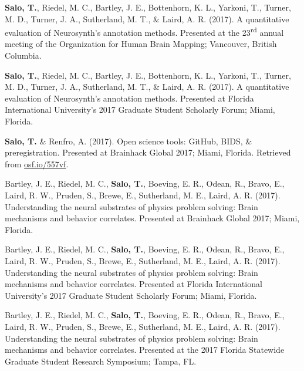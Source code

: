 \documentclass[10pt]{article}
\newcommand{\sectionstyle}{\LARGE \fontfamily{pcr}\selectfont}
\begin{document}
\begin{hangparas}{.25in}{1}
\textbf{Salo, T.}, Riedel, M. C., Bartley, J. E., Bottenhorn, K. L., Yarkoni, T., Turner, M. D., Turner, J. A., Sutherland, M. T., \& Laird, A. R. (2017). A quantitative evaluation of Neurosynth's annotation methods. Presented at the 23\textsuperscript{rd} annual meeting of the Organization for Human Brain Mapping; Vancouver, British Columbia.

\bigskip

\textbf{Salo, T.}, Riedel, M. C., Bartley, J. E., Bottenhorn, K. L., Yarkoni, T., Turner, M. D., Turner, J. A., Sutherland, M. T., \& Laird, A. R. (2017). A quantitative evaluation of Neurosynth's annotation methods. Presented at Florida International University's 2017 Graduate Student Scholarly Forum; Miami, Florida.

\bigskip

\textbf{Salo, T.} \& Renfro, A. (2017). Open science tools: GitHub, BIDS, \& preregistration. Presented at Brainhack Global 2017; Miami, Florida. Retrieved from \href{https://osf.io/557vf}{osf.io/557vf}.

\bigskip

Bartley, J. E., Riedel, M. C., \textbf{Salo, T.}, Boeving, E. R., Odean, R., Bravo, E., Laird, R. W., Pruden, S., Brewe, E., Sutherland, M. E., Laird, A. R. (2017). Understanding the neural substrates of physics problem solving: Brain mechanisms and behavior correlates. Presented at Brainhack Global 2017; Miami, Florida.

\bigskip

Bartley, J. E., Riedel, M. C., \textbf{Salo, T.}, Boeving, E. R., Odean, R., Bravo, E., Laird, R. W., Pruden, S., Brewe, E., Sutherland, M. E., Laird, A. R. (2017). Understanding the neural substrates of physics problem solving: Brain mechanisms and behavior correlates. Presented at Florida International University's 2017 Graduate Student Scholarly Forum; Miami, Florida.

\bigskip

Bartley, J. E., Riedel, M. C., \textbf{Salo, T.}, Boeving, E. R., Odean, R., Bravo, E., Laird, R. W., Pruden, S., Brewe, E., Sutherland, M. E., Laird, A. R. (2017). Understanding the neural substrates of physics problem solving: Brain mechanisms and behavior correlates. Presented at the 2017 Florida Statewide Graduate Student Research Symposium; Tampa, FL.
\end{hangparas}

\bigskip

\begin{center}\sectionstyle{POSTERS}\end{center}
\end{document}
